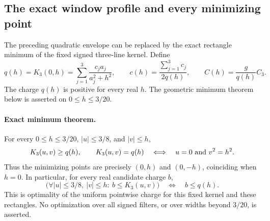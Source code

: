 \subsection{The exact window profile and every minimizing point}
\label{sec:exact-window-profile}

The preceding quadratic envelope can be replaced by the exact rectangle
minimum of the fixed signed three-line kernel.  Define
\[
 q(h)=K_3(0,h)=\sum_{j=1}^3\frac{c_ja_j}{a_j^2+h^2},\qquad
 c(h)=\frac{\sum_{j=1}^3c_j}{2q(h)},\qquad
 C(h)=\frac{g}{q(h)}C_3.
\]
The charge \(q(h)\) is positive for every real \(h\).  The geometric
minimum theorem below is asserted on \(0\le h\le3/20\).

\paragraph{Exact minimum theorem.}
For every \(0\le h\le3/20\), \(|u|\le3/8\), and \(|v|\le h\),
\begin{equation}
 K_3(u,v)\ge q(h),\qquad
 K_3(u,v)=q(h)\quad\Longleftrightarrow\quad u=0\ \hbox{and}\ v^2=h^2.
 \label{eq:exact-window-minimum}
\end{equation}
Thus the minimizing points are precisely \((0,h)\) and \((0,-h)\),
coinciding when \(h=0\).  In particular, for every real candidate charge
\(b\),
\[
 \bigl(\forall |u|\le3/8,\ |v|\le h:\ b\le K_3(u,v)\bigr)
 \quad\Longleftrightarrow\quad b\le q(h).
\]
This is optimality of the uniform pointwise charge for this fixed kernel
and these rectangles.  No optimization over all signed filters, or over
widths beyond \(3/20\), is asserted.

